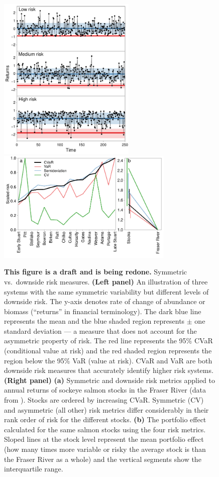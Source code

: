 \begin{figure}[htbp]
\centering
\includegraphics[height=3.10in]{skewness-abundance.pdf}
\includegraphics[height=2.11in]{compare-risk-and-portfolio-scale.pdf} \caption{
  \textbf{This figure is a draft and is being redone.}
  Symmetric vs.\ downside risk measures. \textbf{(Left panel)} An illustration
  of three systems with the same symmetric variability but different levels of
  downside risk. The y-axis denotes rate of change of abundance or biomass
  (``returns'' in financial terminology). The dark blue line represents the
  mean and the blue shaded region represents $\pm$ one standard deviation --- a
  measure that does not account for the asymmetric property of risk. The red
  line represents the 95\% CVaR (conditional value at risk) and the red shaded
  region represents the region below the 95\% VaR (value at risk). CVaR and VaR
  are both downside risk measures that accurately identify higher risk systems.
  \textbf{(Right panel)} \textbf{(a)} Symmetric and downside risk metrics
  applied to annual returns of sockeye salmon stocks in the Fraser River (data
  from \citeauthor{dorner2008} \citeyear{dorner2008}). Stocks are ordered by
  increasing CVaR. Symmetric (CV) and asymmetric (all other) risk metrics
  differ considerably in their rank order of risk for the different stocks.
  \textbf{(b)} The portfolio effect calculated for the same salmon stocks using
  the four risk metrics. Sloped lines at the stock level represent the mean
  portfolio effect (how many times more variable or risky the average stock is
  than the Fraser River as a whole) and the vertical segments show the
  interquartile range.} \label{fig:risk}
\end{figure}

